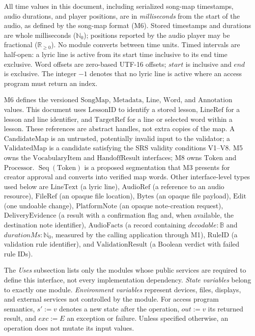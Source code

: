 \documentclass[12pt, titlepage]{article}
\begin{document}
All time values in this document, including serialized song-map
timestamps, audio durations, and player positions, are in
\emph{milliseconds} from the start of the audio, as defined by the
song-map format (M6).  Stored timestamps and durations are whole
milliseconds ($\mathbb{N}_0$); positions reported by the audio player
may be fractional ($\mathbb{R}_{\geq 0}$).  No module converts between
time units.  Timed intervals are half-open: a lyric line is active from
its start time inclusive to its end time exclusive.  Word offsets are zero-based UTF-16
offsets; $start$ is inclusive and $end$ is exclusive.  The integer $-1$
denotes that no lyric line is active where an access program must return an
index.

M6 defines the versioned $\mathrm{SongMap}$, $\mathrm{Metadata}$,
$\mathrm{Line}$, $\mathrm{Word}$, and $\mathrm{Annotation}$ values.
This document uses
$\mathrm{LessonID}$ to identify a stored lesson,
$\mathrm{LineRef}$ for a lesson and line identifier, and
$\mathrm{TargetRef}$ for a line or selected word within a lesson.
These references are abstract handles, not extra copies of the map.
A $\mathrm{CandidateMap}$ is an untrusted, potentially invalid input
to the validator; a $\mathrm{ValidatedMap}$ is a candidate satisfying
the SRS validity conditions V1--V8. M5 owns the
$\mathrm{VocabularyItem}$ and $\mathrm{HandoffResult}$ interfaces;
M8 owns $\mathrm{Token}$ and $\mathrm{Processor}$.
$\operatorname{Seq}(\mathrm{Token})$ is a proposed segmentation that
M3 presents for creator approval and converts into verified map words.
Other interface-level types used below are
$\mathrm{LineText}$ (a lyric line),
$\mathrm{AudioRef}$ (a reference to an audio resource),
$\mathrm{FileRef}$ (an opaque file location),
$\mathrm{Bytes}$ (an opaque file payload),
$\mathrm{Edit}$ (one undoable change),
$\mathrm{PlatformNote}$ (an opaque note-creation request),
$\mathrm{DeliveryEvidence}$ (a result with a confirmation flag
and, when available, the destination note identifier),
$\mathrm{AudioFacts}$ (a record containing
$\mathit{decodable}:\mathbb{B}$ and
$\mathit{durationMs}:\mathbb{N}_0$, measured by the
calling application through M1),
$\mathrm{RuleID}$ (a validation rule identifier), and
$\mathrm{ValidationResult}$ (a Boolean verdict with failed rule IDs).

The \emph{Uses} subsection lists only the modules whose public
services are required to define this interface, not every
implementation dependency. \emph{State variables} belong to exactly
one module. \emph{Environment variables} represent devices, files,
displays, and external services not controlled by the module.
For access program semantics, $s' := v$ denotes a new state after
the operation, $out := v$ its returned result, and $exc := E$ an
exception or failure. Unless specified otherwise, an operation does
not mutate its input values.
\end{document}
